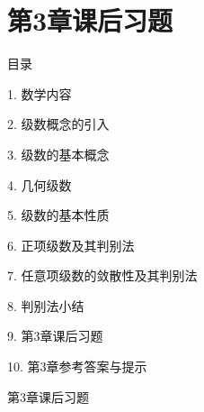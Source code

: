 \documentclass[aspectratio=169,10pt,fontset=fandol]{ctexbeamer}
\begin{document}
\section{第3章课后习题}
\begin{frame}[t,fragile]{目录}
\normalsize
{\color{black}\normalsize 1. 数学内容\par}\vspace{0.3em}
{\color{black}\normalsize 2. 级数概念的引入\par}\vspace{0.3em}
{\color{black}\normalsize 3. 级数的基本概念\par}\vspace{0.3em}
{\color{black}\normalsize 4. 几何级数\par}\vspace{0.3em}
{\color{black}\normalsize 5. 级数的基本性质\par}\vspace{0.3em}
{\color{black}\normalsize 6. 正项级数及其判别法\par}\vspace{0.3em}
{\color{black}\normalsize 7. 任意项级数的敛散性及其判别法\par}\vspace{0.3em}
{\color{black}\normalsize 8. 判别法小结\par}\vspace{0.3em}
{\color{blue}\normalsize 9. 第3章课后习题\par}\vspace{0.3em}
{\color{gray!40}\normalsize 10. 第3章参考答案与提示\par}\vspace{0.3em}
\end{frame}
\begin{frame}[t,fragile]{第3章课后习题}
\normalsize
{\normalsize




}
\end{frame}
\end{document}
